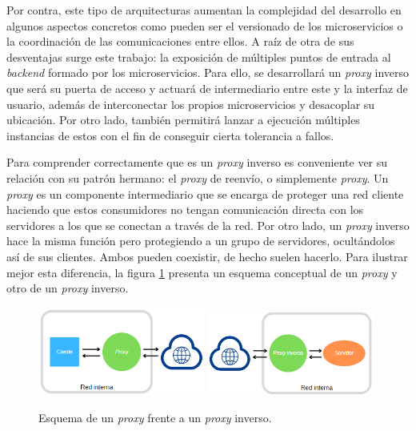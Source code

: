 \documentclass[11pt,spanish,listoffigures]{tfgetsinf}
\begin{document}
Por contra, este tipo de arquitecturas aumentan la complejidad del desarrollo en algunos aspectos concretos como pueden ser el versionado de los microservicios o la coordinación de las comunicaciones entre ellos. A raíz de otra de sus desventajas surge este trabajo: la exposición de múltiples puntos de entrada al \emph{backend} formado por los microservicios. Para ello, se desarrollará un \emph{proxy} inverso que será su puerta de acceso y actuará de intermediario entre este y la interfaz de usuario, además de interconectar los propios microservicios y desacoplar su ubicación. Por otro lado, también permitirá lanzar a ejecución múltiples instancias de estos con el fin de conseguir cierta tolerancia a fallos.

Para comprender correctamente que es un \emph{proxy} inverso es conveniente ver su relación con su patrón hermano: el \emph{proxy} de reenvío, o simplemente \emph{proxy}. Un \emph{proxy} es un componente intermediario que se encarga de proteger una red cliente haciendo que estos consumidores no tengan comunicación directa con los servidores a los que se conectan a través de la red. Por otro lado, un \emph{proxy} inverso hace la misma función pero protegiendo a un grupo de servidores, ocultándolos así de sus clientes. Ambos pueden coexistir, de hecho suelen hacerlo. Para ilustrar mejor esta diferencia, la figura \ref{proxyContraProxyInverso} presenta un esquema conceptual de un \emph{proxy} y otro de un \emph{proxy} inverso.

\begin{figure}[ht]
\centering
\includegraphics[width=0.49\textwidth]{imagenes/proxy}
\includegraphics[width=0.49\textwidth]{imagenes/proxyInverso}
\caption{Esquema de un \emph{proxy} frente a un \emph{proxy} inverso.}
	\label{proxyContraProxyInverso}
\end{figure}
\end{document}
